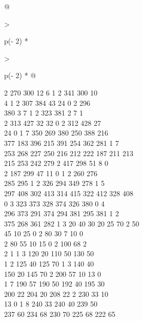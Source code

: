 \begin{question}
\begin{longtable}[]{@{}

  >{\raggedright\arraybackslash}p{(\columnwidth - 2\tabcolsep) * }

  >{\raggedright\arraybackslash}p{(\columnwidth - 2\tabcolsep) * }@{}}
\begin{minipage}[t]{\linewidth}
2 270 300 12 6 1 2 341 300 10\\

4 1 2 307 384 43 24 0 2 296\\

380 3 7 1 2 323 381 2 7 1\\

2 313 427 32 32 0 2 312 428 27\\

24 0 1 7 350 269 380 250 388 216\\

377 183 396 215 391 254 362 281 1 7\\

253 268 227 250 216 212 222 187 211 213\\

215 253 242 279 2 417 298 51 8 0\\

2 187 299 47 11 0 1 2 260 276\\

285 295 1 2 326 294 349 278 1 5\\

297 408 302 413 314 415 322 412 328 408\\

0 3 323 373 328 374 326 380 0 4\\

296 373 291 374 294 381 295 381 1 2\\

375 268 361 282 1 3 20 40 30 20 25 70 2 50\\

45 10 25 0 2 80 30 7 10 0\\

2 80 55 10 15 0 2 100 68 2\\

2 1 1 3 120 20 110 50 130 50\\

1 2 125 40 125 70 1 3 140 40\\

150 20 145 70 2 200 57 10 13 0\\

1 7 190 57 190 50 192 40 195 30\\

200 22 204 20 208 22 2 230 33 10\\

13 0 1 8 240 33 240 40 239 50\\

237 60 234 68 230 70 225 68 222 65\\


\end{minipage}
\end{longtable}
\end{question}

